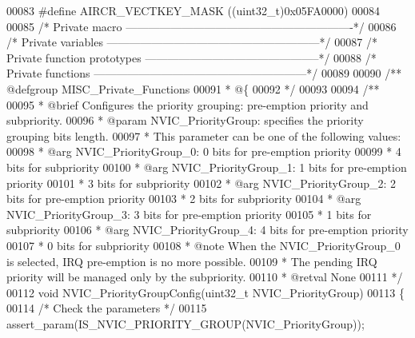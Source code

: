 \begin{DoxyCode}
00083 \textcolor{preprocessor}{#}\textcolor{preprocessor}{define} \textcolor{preprocessor}{AIRCR\_VECTKEY\_MASK}    \textcolor{preprocessor}{(}\textcolor{preprocessor}{(}\textcolor{preprocessor}{uint32\_t}\textcolor{preprocessor}{)}0x05FA0000\textcolor{preprocessor}{)}
00084 
00085 \textcolor{comment}{/* Private macro -------------------------------------------------------------*/}
00086 \textcolor{comment}{/* Private variables ---------------------------------------------------------*/}
00087 \textcolor{comment}{/* Private function prototypes -----------------------------------------------*/}
00088 \textcolor{comment}{/* Private functions ---------------------------------------------------------*/}
00089 
00090 \textcolor{comment}{/** @defgroup MISC\_Private\_Functions}
00091 \textcolor{comment}{  * @\{}
00092 \textcolor{comment}{  */}
00093 
00094 \textcolor{comment}{/**}
00095 \textcolor{comment}{  * @brief  Configures the priority grouping: pre-emption priority and subpriority.}
00096 \textcolor{comment}{  * @param  NVIC\_PriorityGroup: specifies the priority grouping bits length. }
00097 \textcolor{comment}{  *   This parameter can be one of the following values:}
00098 \textcolor{comment}{  *     @arg NVIC\_PriorityGroup\_0: 0 bits for pre-emption priority}
00099 \textcolor{comment}{  *                                4 bits for subpriority}
00100 \textcolor{comment}{  *     @arg NVIC\_PriorityGroup\_1: 1 bits for pre-emption priority}
00101 \textcolor{comment}{  *                                3 bits for subpriority}
00102 \textcolor{comment}{  *     @arg NVIC\_PriorityGroup\_2: 2 bits for pre-emption priority}
00103 \textcolor{comment}{  *                                2 bits for subpriority}
00104 \textcolor{comment}{  *     @arg NVIC\_PriorityGroup\_3: 3 bits for pre-emption priority}
00105 \textcolor{comment}{  *                                1 bits for subpriority}
00106 \textcolor{comment}{  *     @arg NVIC\_PriorityGroup\_4: 4 bits for pre-emption priority}
00107 \textcolor{comment}{  *                                0 bits for subpriority}
00108 \textcolor{comment}{  * @note   When the NVIC\_PriorityGroup\_0 is selected, IRQ pre-emption is no more possible. }
00109 \textcolor{comment}{  *         The pending IRQ priority will be managed only by the subpriority. }
00110 \textcolor{comment}{  * @retval None}
00111 \textcolor{comment}{  */}
00112 \textcolor{keywordtype}{void} NVIC_PriorityGroupConfig(uint32\_t NVIC\_PriorityGroup)
00113 \{
00114   \textcolor{comment}{/* Check the parameters */}
00115   assert_param(IS\_NVIC\_PRIORITY\_GROUP(NVIC\_PriorityGroup));

\end{DoxyCode}
